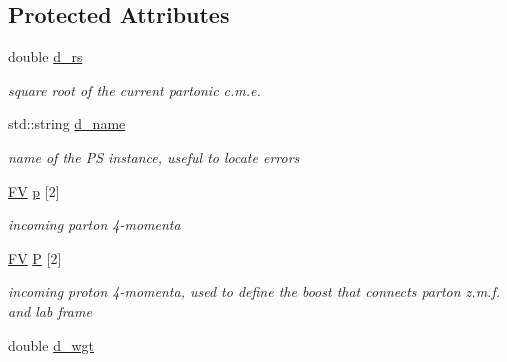 \subsection*{Protected Attributes}
\begin{DoxyCompactItemize}
\item 
\hypertarget{classPS__2_a20ee7f6afb71183f2f61c7049b2e1c9e}{double \hyperlink{classPS__2_a20ee7f6afb71183f2f61c7049b2e1c9e}{d\-\_\-rs}}\label{classPS__2_a20ee7f6afb71183f2f61c7049b2e1c9e}

\begin{DoxyCompactList}\small\item\em square root of the current partonic c.\-m.\-e. \end{DoxyCompactList}\item 
\hypertarget{classPS__2_a28b70b9c3c9c5d179559af7b03cfc5bf}{std\-::string \hyperlink{classPS__2_a28b70b9c3c9c5d179559af7b03cfc5bf}{d\-\_\-name}}\label{classPS__2_a28b70b9c3c9c5d179559af7b03cfc5bf}

\begin{DoxyCompactList}\small\item\em name of the P\-S instance, useful to locate errors \end{DoxyCompactList}\item 
\hypertarget{classPS__2_ac717630d614c3bce592b1d0ba1d969c7}{\hyperlink{classFV}{F\-V} \hyperlink{classPS__2_ac717630d614c3bce592b1d0ba1d969c7}{p} \mbox{[}2\mbox{]}}\label{classPS__2_ac717630d614c3bce592b1d0ba1d969c7}

\begin{DoxyCompactList}\small\item\em incoming parton 4-\/momenta \end{DoxyCompactList}\item 
\hypertarget{classPS__2_a9c8c1bd53ef9086e96705be1377564ec}{\hyperlink{classFV}{F\-V} \hyperlink{classPS__2_a9c8c1bd53ef9086e96705be1377564ec}{P} \mbox{[}2\mbox{]}}\label{classPS__2_a9c8c1bd53ef9086e96705be1377564ec}

\begin{DoxyCompactList}\small\item\em incoming proton 4-\/momenta, used to define the boost that connects parton z.\-m.\-f. and lab frame \end{DoxyCompactList}\item 
\hypertarget{classPS__2_a7840687732819d92810f9a2666621650}{double \hyperlink{classPS__2_a7840687732819d92810f9a2666621650}{d\-\_\-wgt}}\label{classPS__2_a7840687732819d92810f9a2666621650}


\end{DoxyCompactItemize}
